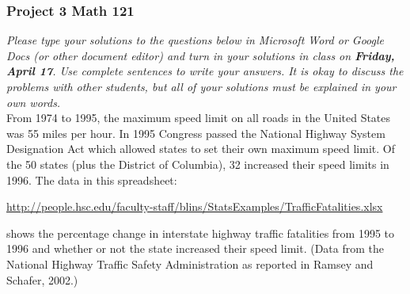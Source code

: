 \documentclass[12pt]{exam}
\begin{document}
\subsubsection*{Project 3 \hfill Math 121}

\textit{Please type your solutions to the questions below in Microsoft Word or Google Docs (or other document editor) and turn in your solutions in class on \textbf{Friday, April 17}. Use complete sentences to write your answers.  It is okay to discuss the problems with other students, but all of your solutions must be explained in your own words. }  \\

\noindent
From 1974 to 1995, the maximum speed limit on all roads in the United States was 55 miles per hour.  In 1995 Congress passed the National Highway System Designation Act which allowed states to set their own maximum speed limit. Of the 50 states (plus the District of Columbia), 32 increased their speed limits in 1996. The data in this spreadsheet:
\begin{center}
{\small
\url{http://people.hsc.edu/faculty-staff/blins/StatsExamples/TrafficFatalities.xlsx}
}
\end{center}
shows the percentage change in interstate highway traffic fatalities from 1995 to 1996 and whether or not the state
increased their speed limit. (Data from the National Highway Traffic Safety Administration as reported
in Ramsey and Schafer, 2002.)
\end{document}
